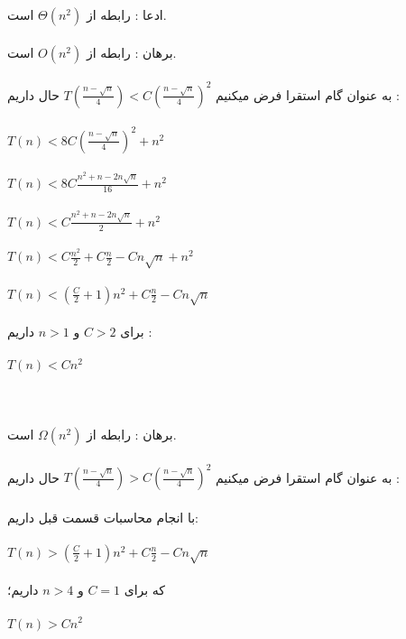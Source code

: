\subproblem{}
ادعا : رابطه از $\Theta(n^2)$ است.\\\\
برهان : رابطه از $O(n^2)$ است. \\\\
به عنوان گام استقرا فرض میکنیم $T(\frac{n - \sqrt{n}}{4}) < C (\frac{n - \sqrt{n}}{4})^2$ حال داریم : \\\\
$T(n) < 8C (\frac{n - \sqrt{n}}{4})^2 + n^2$\\\\
$T(n) < 8C \frac{n^2 +n - 2n\sqrt{n}}{16} + n^2$\\\\
$T(n) < C \frac{n^2 +n - 2n\sqrt{n}}{2} + n^2$\\\\
$T(n) < C\frac{n^2}{2} + C\frac{n}{2} - Cn\sqrt{n} + n^2$\\\\
$T(n) < (\frac{C}{2}+1)n^2 + C\frac{n}{2} - Cn\sqrt{n}$\\\\
برای $C>2$ و $n>1$ داریم : \\\\
$T(n) < Cn^2$\\\\
\\
\\
برهان : رابطه از $\Omega(n^2)$ است. \\\\
به عنوان گام استقرا فرض میکنیم $T(\frac{n - \sqrt{n}}{4}) > C (\frac{n - \sqrt{n}}{4})^2$ حال داریم : \\\\
با انجام محاسبات قسمت قبل داریم:\\\\
$T(n) > (\frac{C}{2}+1)n^2 + C\frac{n}{2} - Cn\sqrt{n}$\\\\
که برای $C = 1$ و $n > 4$ داریم؛\\\\
$T(n) > Cn^2$\\\\